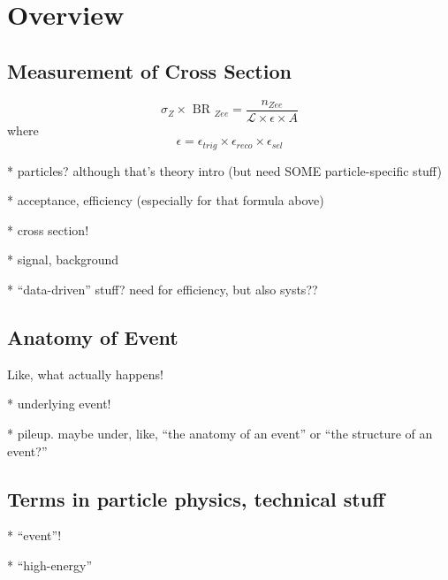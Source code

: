 \chapter{Overview}
\label{over}
\section{Measurement of Cross Section}
\label{over:xsec}
\[
\sigma_{ Z } \times \textrm{ BR }_{ Zee } = \frac{ n_{ Zee } }{  \mathcal{ L } \times \epsilon \times A}
\]
where
\[
\epsilon = \epsilon_{ trig } \times \epsilon_{ reco } \times \epsilon_{ sel }
\]

   * particles?  although that's theory intro (but need SOME particle-specific stuff) 



   * acceptance, efficiency (especially for that formula above)

   * cross section!

   * signal, background

   * ``data-driven'' stuff?  need for efficiency, but also systs??


\section{Anatomy of Event}

Like, what actually happens!

   * underlying event!

   * pileup.  maybe under, like, ``the anatomy of an event'' or ``the structure of an event?''

\section{Terms in particle physics, technical stuff}

   * ``event''!  

   * ``high-energy''

